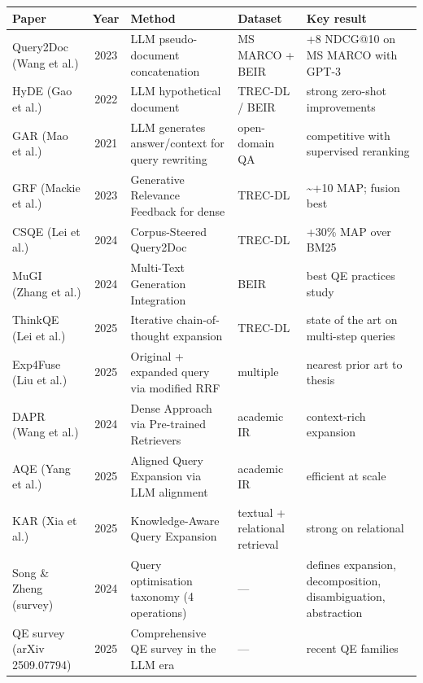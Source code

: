 \begin{tabular}{@{}>{\raggedright\arraybackslash}p{2.9cm}c>{\raggedright\arraybackslash}p{3.7cm}>{\raggedright\arraybackslash}p{2.4cm}>{\raggedright\arraybackslash}p{3.7cm}@{}}
\toprule
Paper & Year & Method & Dataset & Key result \\
\midrule
Query2Doc (Wang et al.) & 2023 & LLM pseudo-document concatenation & MS MARCO + BEIR & +8 NDCG@10 on MS MARCO with GPT-3 \\
HyDE (Gao et al.) & 2022 & LLM hypothetical document & TREC-DL / BEIR & strong zero-shot improvements \\
GAR (Mao et al.) & 2021 & LLM generates answer/context for query rewriting & open-domain QA & competitive with supervised reranking \\
GRF (Mackie et al.) & 2023 & Generative Relevance Feedback for dense & TREC-DL & \textasciitilde +10 MAP; fusion best \\
CSQE (Lei et al.) & 2024 & Corpus-Steered Query2Doc & TREC-DL & +30\% MAP over BM25 \\
MuGI (Zhang et al.) & 2024 & Multi-Text Generation Integration & BEIR & best QE practices study \\
ThinkQE (Lei et al.) & 2025 & Iterative chain-of-thought expansion & TREC-DL & state of the art on multi-step queries \\
Exp4Fuse (Liu et al.) & 2025 & Original + expanded query via modified RRF & multiple & nearest prior art to thesis \\
DAPR (Wang et al.) & 2024 & Dense Approach via Pre-trained Retrievers & academic IR & context-rich expansion \\
AQE (Yang et al.) & 2025 & Aligned Query Expansion via LLM alignment & academic IR & efficient at scale \\
KAR (Xia et al.) & 2025 & Knowledge-Aware Query Expansion & textual + relational retrieval & strong on relational \\
Song \& Zheng (survey) & 2024 & Query optimisation taxonomy (4 operations) & --- & defines expansion, decomposition, disambiguation, abstraction \\
QE survey (arXiv 2509.07794) & 2025 & Comprehensive QE survey in the LLM era & --- & recent QE families \\
\bottomrule
\end{tabular}
